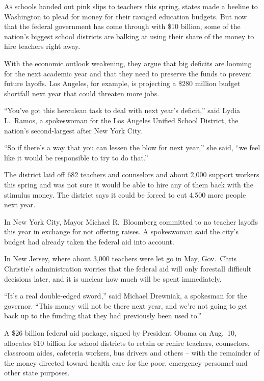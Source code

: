 ﻿\documentclass[12pt]{article}
\begin{document}
\lettrine{A}{s} schools handed out pink slips to teachers this spring,
states made a beeline to Washington to plead for money for their ravaged education budgets. But now
that the federal government has come through with \$10 billion, some of the nation's biggest school
districts are balking at using their share of the money to hire teachers right away.

With the economic outlook weakening, they argue that big deficits are looming for the next academic
year and that they need to preserve the funds to prevent future layoffs. Los Angeles, for example,
is projecting a \$280 million budget shortfall next year that could threaten more jobs.

``You've got this herculean task to deal with next year's deficit,'' said Lydia L.~Ramos, a
spokeswoman for the Los Angeles Unified School District, the nation's second-largest after New York
City.

``So if there's a way that you can lessen the blow for next year,'' she said, ``we feel like it
would be responsible to try to do that.''

The district laid off 682 teachers and counselors and about 2,000 support workers this spring and
was not sure it would be able to hire any of them back with the stimulus money. The district says it
could be forced to cut 4,500 more people next year.

In New York City, Mayor Michael R.~Bloomberg committed to no teacher layoffs this year in exchange
for not offering raises. A spokeswoman said the city's budget had already taken the federal aid into
account.

In New Jersey, where about 3,000 teachers were let go in May, Gov.~Chris Christie's administration
worries that the federal aid will only forestall difficult decisions later, and it is unclear how
much will be spent immediately.

``It's a real double-edged sword,'' said Michael Drewniak, a spokesman for the governor. ``This
money will not be there next year, and we're not going to get back up to the funding that they had
previously been used to.''

A \$26 billion federal aid package, signed by President Obama on Aug.~10, allocates \$10 billion for
school districts to retain or rehire teachers, counselors, classroom aides, cafeteria workers, bus
drivers and others -- with the remainder of the money directed toward health care for the poor,
emergency personnel and other state purposes.
\end{document}

